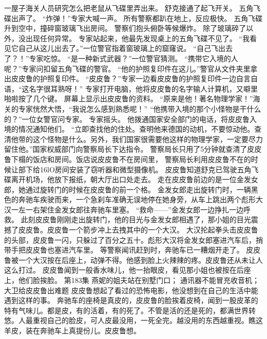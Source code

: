 \documentclass[a4paper,12pt,UTF8,twoside]{ctexbook}
\begin{document}
        一屋子海关人员研究怎么把老鼠从飞碟里弄出来。 
        舒克接通了起飞开关。 
        五角飞碟出声了。 
        “炸弹！”专家大喊一声。 
        所有警察都趴在地上，反应极快。 
        五角飞碟升到空中，撞碎窗玻璃飞出房间。 
        警察们抱头俯卧等候爆炸。 
        除了玻璃碎了以外，没出现任何异常。 
        专家站起来，他最先发现桌上的五角飞碟不见了。 
        “我看见它自己从这儿出去了。”一位警官指着窗玻璃上的窟窿说。 
        “自己飞出去了？！”专家吃惊。 
        “是一种新式武器？”一位警官猜测。 
        “携带它入境的人呢？”专家问扣留五角飞碟的警官。 
        “他的护照复印件在这儿。”警官从文件夹里拿出皮皮鲁的护照复印件。 
        “皮皮鲁？”专家一边看皮皮鲁的护照复印件一边自言自语，“这名字很耳熟呀！” 
        专家打开电脑，他将皮皮鲁的名字输人计算机，又噼里啪啦按了几个键。 
        屏幕上显示出皮皮鲁的资料。 
        “原来是他！著名物理学家！”海关的专家恍然大悟，“我说怎么感到熟悉呢！” 
        “他携带入境的那个小怪物是干什么的？”一位女警官问专家。 
        专家摇头。 
        他拨通国家安全部门的电话，将皮皮鲁入境的情况通知他们。 
        “立即查找他的住处。查明他来德国的动机，不要惊动他。查清他带的这个怪物是什么。另外，我们国家很需要他这样的物理学家，一定要尽力留住他。”国家权威部门向警察局长下达指令。 
        警察局长只用了5分钟就查清了皮皮鲁下榻的饭店和房间。饭店说皮皮鲁不在房间里， 
        警察局长利用皮皮鲁不在的时候让部下给16lO房间安装了窃听器和微型摄像机。 
        皮皮鲁知道舒克已驾驶五角飞碟离开机场，他放下报纸，朝大厅出口处走去。 
        走在皮皮鲁前边的是一位金发女郎，她通过旋转门的时候在皮皮鲁的前一个格。 
        金发女郎走出旋转门时，一辆黑色的奔驰车疾驶而来，一个急刹车准确无误地停在她身旁，从车上跳出两个彪形大汉一左一右架住金发女郎往奔驰车里塞。 
        “救命——”金发女郎一边挣扎一边呼救。 
        此刻皮皮鲁刚刚走出旋转门，他的目光与金发女郎相遇了，那小姐的目光震撼了皮皮鲁。皮皮鲁一个箭步冲上去拽其中的一个大汉。 
        大汉抡起拳头击皮皮鲁的头部，皮皮鲁一闪，只躲过了百分之五十。彪形大汉将金发女郎塞进汽车后，捎带手把皮皮鲁也塞进汽车里。 
        等警察闻讯赶到时，奔驰车已一糟烟开走了。 
        皮皮鲁被一个大汉按在后座上，动弹不得。他感到脸上火辣辣的疼。皮皮鲁还从未让人这么打过。 
        皮皮鲁闻到一般香水味儿，他一抬眼皮，看见那小姐也被按在后座上，他们脸挨脸。   第183集 
        燕妮的姐夫站在别墅门口； 
        通讯器不能冒充收音机； 
        大卫给皮皮鲁出难题   
        皮皮鲁想起了看过的恐怖电影，他没想到在自己的生活中能遇到这样的事。 
        奔驰车的座椅是真皮的，皮皮鲁的脸挨着皮椅，闻到一股皮革的特有气味儿。都是皮，有的活着，有的死了。不管是活的还是死的，都满世界转悠。人最重视自己的脸皮，可人皮最没用，一死全完。越没用的东西越重视。瞧这羊皮，装在奔驰车上真提份儿。皮皮鲁想。 
\end{document}
